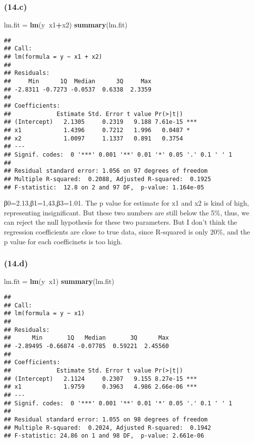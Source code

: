 \documentclass[]{article}
\newenvironment{Shaded}{\begin{snugshade}}{\end{snugshade}}
\newcommand{\KeywordTok}[1]{\textcolor[rgb]{0.13,0.29,0.53}{\textbf{#1}}}
\newcommand{\NormalTok}[1]{#1}
\newcommand{\OperatorTok}[1]{\textcolor[rgb]{0.81,0.36,0.00}{\textbf{#1}}}
\newcommand{\StringTok}[1]{\textcolor[rgb]{0.31,0.60,0.02}{#1}}
\begin{document}
\hypertarget{c-2}{%
\subsubsection{(14.c)}\label{c-2}}

\begin{Shaded}
\begin{Highlighting}[]
\NormalTok{lm.fit =}\StringTok{ }\KeywordTok{lm}\NormalTok{(y}\OperatorTok{~}\NormalTok{x1}\OperatorTok{+}\NormalTok{x2)}
\KeywordTok{summary}\NormalTok{(lm.fit)}
\end{Highlighting}
\end{Shaded}

\begin{verbatim}
## 
## Call:
## lm(formula = y ~ x1 + x2)
## 
## Residuals:
##     Min      1Q  Median      3Q     Max 
## -2.8311 -0.7273 -0.0537  0.6338  2.3359 
## 
## Coefficients:
##             Estimate Std. Error t value Pr(>|t|)    
## (Intercept)   2.1305     0.2319   9.188 7.61e-15 ***
## x1            1.4396     0.7212   1.996   0.0487 *  
## x2            1.0097     1.1337   0.891   0.3754    
## ---
## Signif. codes:  0 '***' 0.001 '**' 0.01 '*' 0.05 '.' 0.1 ' ' 1
## 
## Residual standard error: 1.056 on 97 degrees of freedom
## Multiple R-squared:  0.2088, Adjusted R-squared:  0.1925 
## F-statistic:  12.8 on 2 and 97 DF,  p-value: 1.164e-05
\end{verbatim}

β0=2.13,β1=1,43,β3=1.01. The p value for estimate for x1 and x2 is kind
of high, representing insignificant. But these two numbers are still
below the 5\%, thus, we can reject the null hypothesis for these two
parameters. But I don't think the regression coefficients are close to
true data, since R-squared is only 20\%, and the p value for each
coefficinets is too high.

\hypertarget{d-2}{%
\subsubsection{(14.d)}\label{d-2}}

\begin{Shaded}
\begin{Highlighting}[]
\NormalTok{lm.fit =}\StringTok{ }\KeywordTok{lm}\NormalTok{(y}\OperatorTok{~}\NormalTok{x1)}
\KeywordTok{summary}\NormalTok{(lm.fit)}
\end{Highlighting}
\end{Shaded}

\begin{verbatim}
## 
## Call:
## lm(formula = y ~ x1)
## 
## Residuals:
##      Min       1Q   Median       3Q      Max 
## -2.89495 -0.66874 -0.07785  0.59221  2.45560 
## 
## Coefficients:
##             Estimate Std. Error t value Pr(>|t|)    
## (Intercept)   2.1124     0.2307   9.155 8.27e-15 ***
## x1            1.9759     0.3963   4.986 2.66e-06 ***
## ---
## Signif. codes:  0 '***' 0.001 '**' 0.01 '*' 0.05 '.' 0.1 ' ' 1
## 
## Residual standard error: 1.055 on 98 degrees of freedom
## Multiple R-squared:  0.2024, Adjusted R-squared:  0.1942 
## F-statistic: 24.86 on 1 and 98 DF,  p-value: 2.661e-06
\end{verbatim}
\end{document}
